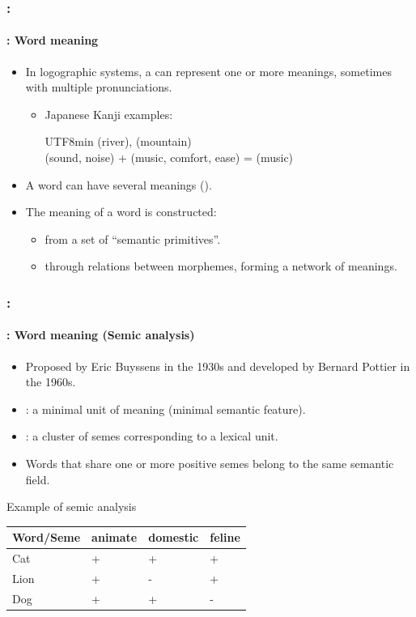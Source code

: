 \documentclass[xcolor=table]{beamer}
\begin{document}
\begin{frame}
	\frametitle{\insertshortsubtitle: \insertsection}
	\framesubtitle{\insertsubsection: Word meaning}
	
	\begin{itemize}
		\item In logographic systems, a  can represent one or more meanings, sometimes with multiple pronunciations.
		\begin{itemize}
			\item Japanese Kanji examples:
			\begin{CJK}{UTF8}{min}
				 (river),  (mountain) \\
				 (sound, noise) +  (music, comfort, ease) =  (music)
			\end{CJK}
		\end{itemize}
		
		\item A word can have several meanings ().
		
		\item The meaning of a word is constructed:
		\begin{itemize}
			\item from a set of ``semantic primitives''.
			\item through relations between morphemes, forming a network of meanings.
		\end{itemize}
	\end{itemize}

\end{frame}


\begin{frame}
	\frametitle{\insertshortsubtitle: \insertsection}
	\framesubtitle{\insertsubsection: Word meaning (Semic analysis)}

	\begin{itemize}
		\item Proposed by Eric Buyssens in the 1930s and developed by Bernard Pottier in the 1960s.
		\item {}: a minimal unit of meaning (minimal semantic feature).
		\item {}: a cluster of semes corresponding to a lexical unit.
		\item Words that share one or more positive semes belong to the same semantic field.
	\end{itemize}
	
	\begin{exampleblock}{Example of semic analysis}
		\centering
		\begin{tabular}{|l|l|l|l|}
			\hline
			Word/Seme & animate & domestic & feline \\
			\hline
			Cat & + & + & + \\
			\hline
			Lion & + & - & + \\
			\hline
			Dog & + & + & - \\
			\hline
		\end{tabular}
	\end{exampleblock}

\end{frame}
\end{document}
